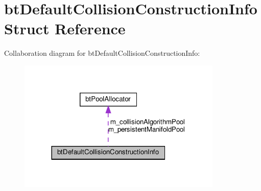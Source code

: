 \hypertarget{structbtDefaultCollisionConstructionInfo}{}\section{bt\+Default\+Collision\+Construction\+Info Struct Reference}
\label{structbtDefaultCollisionConstructionInfo}


Collaboration diagram for bt\+Default\+Collision\+Construction\+Info\+:
\nopagebreak
\begin{figure}[H]
\begin{center}
\leavevmode
\includegraphics[width=276pt]{structbtDefaultCollisionConstructionInfo__coll__graph}
\end{center}
\end{figure}

